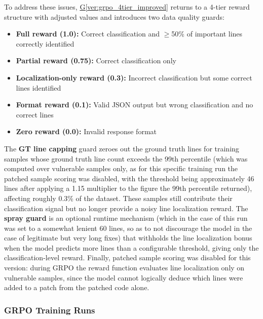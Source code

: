 \documentclass[12pt,a4paper]{article}
\begin{document}
To address these issues, \hyperref[ver:grpo_4tier_improved]{G\ref*{ver:grpo_4tier_improved}} returns to a 4-tier reward structure with adjusted values and introduces two data quality guards:
\begin{itemize}
\item \textbf{Full reward (1.0):} Correct classification and $\geq$50\% of important lines correctly identified
\item \textbf{Partial reward (0.75):} Correct classification only
\item \textbf{Localization-only reward (0.3):} Incorrect classification but some correct lines identified
\item \textbf{Format reward (0.1):} Valid JSON output but wrong classification and no correct lines
\item \textbf{Zero reward (0.0):} Invalid response format
\end{itemize}

The \textbf{GT line capping} guard zeroes out the ground truth lines for training samples whose ground truth line count exceeds the 99th percentile (which was computed over vulnerable samples only, as for this specific training run the patched sample scoring was disabled, with the threshold being approximately 46 lines after applying a 1.15 multiplier to the figure the 99th percentile returned), affecting roughly 0.3\% of the dataset. These samples still contribute their classification signal but no longer provide a noisy line localization reward. The \textbf{spray guard} is an optional runtime mechanism (which in the case of this run was set to a somewhat lenient 60 lines, so as to not discourage the model in the case of legitimate but very long fixes) that withholds the line localization bonus when the model predicts more lines than a configurable threshold, giving only the classification-level reward. Finally, patched sample scoring was disabled for this version: during GRPO the reward function evaluates line localization only on vulnerable samples, since the model cannot logically deduce which lines were added to a patch from the patched code alone.


\subsubsection{GRPO Training Runs}
\end{document}
